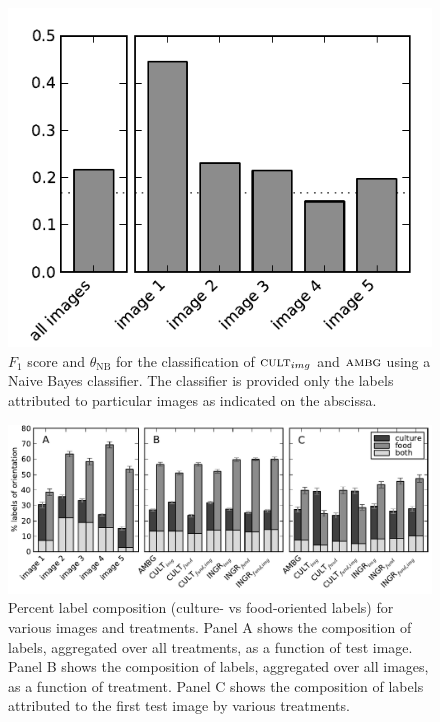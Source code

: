 \documentclass[a4paper]{report}
\begin{document}
\begin{figure}
	\includegraphics{figs/longitudinalF1scores-t0-t1_25.pdf}
	\caption{ $F_1$ score and $\theta_\text{NB}$ for the classification of 
	$\textsc{cult}_{img}$ and $\textsc{ambg}$ using a Naive Bayes 
	classifier.  The classifier is provided only the labels attributed to
	particular images as indicated on the abscissa.}
\end{figure}

\begin{figure}
	\includegraphics{figs/orientationVsTreatment.pdf}
	\caption{Percent label composition (culture- vs food-oriented labels) for 
		various images and treatments.  Panel A shows the composition of 
		labels, aggregated over all treatments, as a function of test image.
		Panel B shows the composition of labels, aggregated over all images, as
		a function of treatment.  Panel C shows the composition of labels 
		attributed to the first test image by various treatments.}
\end{figure}
\end{document}
